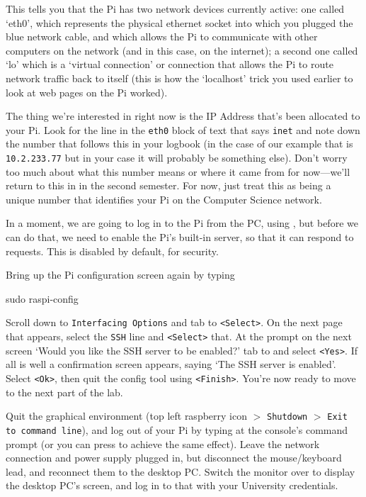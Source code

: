 This tells you that the Pi has two network devices currently active:
one called `eth0', which represents the physical ethernet socket into
which you plugged the blue network cable, and which allows the Pi to
communicate with other computers on the network (and in this case, on
the internet); a second one called `lo' which is a `virtual
connection' or  connection that allows the Pi
to route network traffic back to itself (this is how the `localhost'
trick you used earlier to look at web pages on the Pi worked).

The thing we're interested in right now is the IP Address that's been
allocated to your Pi. Look for the line in the \texttt{eth0} block of
text that says \texttt{inet} and note down the number that
follows this in your logbook (in the case of our example that is
\texttt{10.2.233.77} but in your case it will probably be something
else). Don't worry too much about what this number means or where it
came from for now---we'll return to this in  in
the second semester. For now, just treat this as being a unique number
that identifies your Pi on the Computer Science network.

In a moment, we are going to log in to the Pi from the PC, using
, but before we can do that, we need to enable the Pi's
built-in  server, so that it can respond to
 requests. This is disabled by default, for security.

Bring up the Pi configuration screen again by typing

\begin{ttoutenv}
sudo raspi-config
\end{ttoutenv}

Scroll down to \verb+Interfacing Options+ and tab to
\verb+<Select>+. On the next page that appears, select the \verb+SSH+
line and \verb+<Select>+ that. At the prompt on the next screen `Would
you like the SSH server to be enabled?' tab to and select
\verb+<Yes>+. If all is well a confirmation screen appears, saying
`The SSH server is enabled'. Select \verb+<Ok>+, then quit the config
tool using \verb+<Finish>+. You're now ready to move to the next part of the lab.

Quit the graphical environment (top left raspberry icon $>$ \verb+Shutdown+
$>$ \verb+Exit to command line+), and log out of your Pi by typing
 at the console's command prompt (or you can
press  to achieve the same effect). Leave the network
connection and power supply plugged in, but disconnect the
mouse/keyboard lead, and reconnect them to the desktop PC. Switch the
monitor over to display the desktop PC's screen, and log in to that
with your University credentials.

